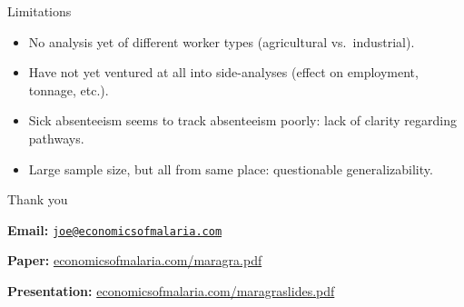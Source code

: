 \documentclass[ignorenonframetext,]{beamer}
\providecommand{\tightlist}{%
  \setlength{\itemsep}{0pt}\setlength{\parskip}{0pt}}
\begin{document}
\begin{frame}{Limitations}

\begin{itemize}
\tightlist
\item
  No analysis yet of different worker types (agricultural
  vs.~industrial).
\item
  Have not yet ventured at all into side-analyses (effect on employment,
  tonnage, etc.).
\item
  Sick absenteeism seems to track absenteeism poorly: lack of clarity
  regarding pathways.\\
\item
  Large sample size, but all from same place: questionable
  generalizability.
\end{itemize}

\end{frame}

\begin{frame}{Thank you}

\textbf{Email:}
\href{mailto:joe@economicsofmalaria.com}{\nolinkurl{joe@economicsofmalaria.com}}

\textbf{Paper:}
\href{http://economicsofmalaria.com/maragra.pdf}{economicsofmalaria.com/maragra.pdf}

\textbf{Presentation:}
\href{http://economicsofmalaria.com/maragraslides.pdf}{economicsofmalaria.com/maragraslides.pdf}

\end{frame}
\end{document}
